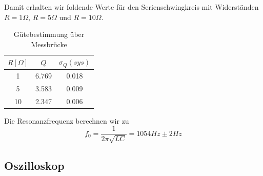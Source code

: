 \documentclass[12pt,a4paper]{article}
\begin{document}
Damit erhalten wir foldende Werte für den Serienschwingkreis mit Widerständen $R=1\Omega$, $R=5\Omega$ und $R=10\Omega$.
\begin{table}[H]
	\centering
	\begin{tabular}{|c|c|c|}
		\hline
		$R[\Omega]$&$Q$&$\sigma_Q(sys)$\\
		\hline
		1&6.769&0.018\\
		5&3.583&0.009\\
		10&2.347&0.006\\
		\hline
	\end{tabular}
	\caption{Gütebestimmung über Messbrücke}
	\label{table:guete_messbruecke}
\end{table}
Die Resonanzfrequenz berechnen wir zu
\begin{equation}
f_0=\frac{1}{2\pi\sqrt{LC}}=1054Hz\pm 2Hz
\end{equation}
		
\subsection{Oszilloskop}
\end{document}
